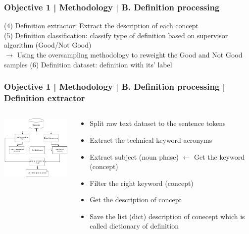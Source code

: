 \documentclass{beamer}
\begin{document}
\begin{frame}
\frametitle{Objective 1 | Methodology | B. Definition processing}
(4) Definition extractor: Extract the description of each concept\\
(5) Definition classification: classify type of definition based on supervisor algorithm (Good/Not Good)\\
$\rightarrow$ Using the oversampling methodology to reweight the Good and Not Good samples
(6) Definition dataset: definition with its' label
\end{frame}
\begin{frame}
\frametitle{Objective 1 | Methodology | B. Definition processing | Definition extractor}
\begin{columns}
		\begin{column}{.5\textwidth}
		\includegraphics[width=50mm]{df1.png}
	\end{column}
	\begin{column}{.65\textwidth}
		
		\begin{itemize}
			\item Split raw text dataset to the sentence tokens
			\item Extract the technical keyword acronyms
			\item Extract subject (noun phase) $\leftarrow$ Get the keyword (concept)
			\item Filter the right keyword (concept)
			\item Get the description of concept
			\item Save the list (dict) description of conecept which is called dictionary of definition
		\end{itemize}
	\end{column}

	
\end{columns}
\end{frame}
\end{document}
